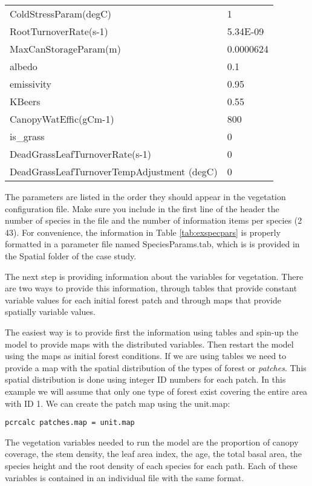 \begin{longtable}{|p{6.5cm}| l|}
ColdStressParam(degC)	&	1	\\
RootTurnoverRate(s-1)	&	5.34E-09	\\
MaxCanStorageParam(m)	&	0.0000624	\\
albedo	&	0.1	\\
emissivity	&	0.95	\\
KBeers	&	0.55	\\
CanopyWatEffic(gCm-1)	&	800	\\
is\_grass	&	0	\\
DeadGrassLeafTurnoverRate(s-1)	&	0	\\
DeadGrassLeafTurnoverTempAdjustment (degC)	&	0	
\end{longtable}			

 
The parameters are listed in the order they should appear in the vegetation configuration file. Make sure you include in the first line of the header the number of species in the file and the number of information items per species (2 43). For convenience, the information in Table \ref{tab:exspecpars} is properly formatted in a parameter file named \textsf{SpeciesParams.tab}, which is is provided in the \textsf{Spatial} folder of the case study.

The next step is providing information about the variables for vegetation. There are two ways to provide this information, through tables that provide constant variable values for each initial forest patch and through maps that provide spatially variable values.
 
The easiest way is to provide first the information using tables and spin-up the model to provide maps with the distributed variables. Then restart the model using the maps as initial forest conditions. If we are using tables we need to provide a map with the spatial distribution of the types of forest or \textit{patches}. This spatial distribution is done using integer ID numbers for each patch. In this example we will assume that only one type of forest exist covering the entire area with ID 1. We can create the patch map using the unit.map:

\begin{verbatim}
pcrcalc patches.map = unit.map 
\end{verbatim}
   
The vegetation variables needed to run the model are the proportion of canopy coverage, the stem density, the leaf area index, the age, the total basal area, the species height and the root density of each species for each path. Each of these variables is contained in an individual file with the same format. 

